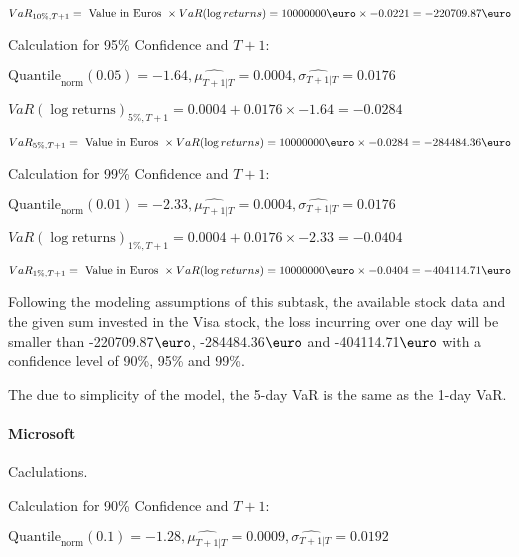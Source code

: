 \indent\indent $VaR_{10\%, T + 1} = \text{ Value in Euros } \times VaR(\log returns) = 10 000 000 \text{\euro} \times-0.0221 = -220709.87 \text{\euro}$\newline




Calculation for 95\% Confidence and $T+1$:

\indent\indent $\text{Quantile}_\text{norm}(0.05) = -1.64,\hat{\mu_{T+1|T}} = 0.0004, \hat{\sigma_{T+1|T}} = 0.0176$

\indent\indent $VaR(\log \text{returns})_{5\%, T + 1} = 0.0004 + 0.0176\times-1.64 = -0.0284$

\indent\indent $VaR_{5\%, T + 1} = \text{ Value in Euros } \times VaR(\log returns) = 10 000 000 \text{\euro} \times-0.0284 = -284484.36 \text{\euro}$\newline




Calculation for 99\% Confidence and $T+1$:

\indent\indent $\text{Quantile}_\text{norm}(0.01) = -2.33,\hat{\mu_{T+1|T}} = 0.0004, \hat{\sigma_{T+1|T}} = 0.0176$

\indent\indent $VaR(\log \text{returns})_{1\%, T + 1} = 0.0004 + 0.0176\times-2.33 = -0.0404$

\indent\indent $VaR_{1\%, T + 1} = \text{ Value in Euros } \times VaR(\log returns) = 10 000 000 \text{\euro} \times-0.0404 = -404114.71 \text{\euro}$\newline


Following the modeling assumptions of this subtask, the available stock data and the given sum invested in the Visa stock, the loss incurring over one day will be smaller than -220709.87$\text{\euro}$, -284484.36$\text{\euro}$  and -404114.71$\text{\euro}$  with a confidence level of 90\%, 95\%  and 99\%.

The due to simplicity of the model, the 5-day VaR is the same as the 1-day VaR.



\paragraph{Microsoft} Caclulations.\newline \indent 




Calculation for 90\% Confidence and $T+1$:

\indent\indent $\text{Quantile}_\text{norm}(0.1) = -1.28,\hat{\mu_{T+1|T}} = 0.0009, \hat{\sigma_{T+1|T}} = 0.0192$

